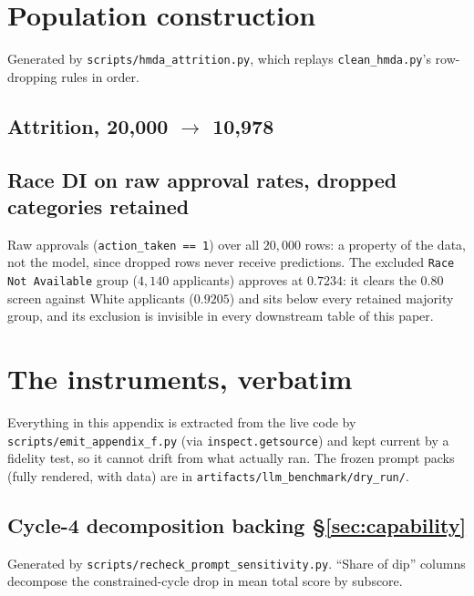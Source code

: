 \documentclass[sigconf,nonacm]{acmart}
\begin{document}
{\scriptsize}

\section{Population construction}
\label{app:attrition}

Generated by \texttt{scripts/hmda\_attrition.py}, which replays
\texttt{clean\_hmda.py}'s row-dropping rules in order.

\subsection*{Attrition, 20{,}000 $\to$ 10{,}978}
{\small}

\subsection*{Race DI on raw approval rates, dropped categories retained}

Raw approvals (\texttt{action\_taken == 1}) over all $20{,}000$ rows: a
property of the data, not the model, since dropped rows never receive
predictions. The excluded \texttt{Race Not Available} group ($4{,}140$
applicants) approves at $0.7234$: it clears the $0.80$ screen against White
applicants ($0.9205$) and sits below every retained majority group, and its
exclusion is invisible in every downstream table of this paper.

{\small}

\section{The instruments, verbatim}
\label{app:instruments}

Everything in this appendix is extracted from the live code by
\texttt{scripts/emit\_appendix\_f.py} (via \texttt{inspect.getsource}) and
kept current by a fidelity test, so it cannot drift from what actually ran.
The frozen prompt packs (fully rendered, with data) are in
\texttt{artifacts/llm\_benchmark/dry\_run/}.

\subsection*{Cycle-4 decomposition backing \S\ref{sec:capability}}

Generated by \texttt{scripts/recheck\_prompt\_sensitivity.py}. ``Share of
dip'' columns decompose the constrained-cycle drop in mean total score by
subscore.
\end{document}
